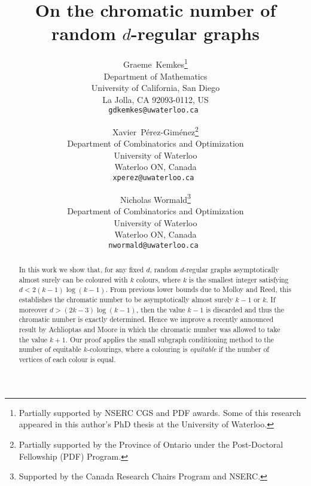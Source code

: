 \documentclass[12pt]{article}
\begin{document}
  \title{ On the chromatic number of random $d$-regular graphs}
\author{
Graeme~Kemkes\thanks{Partially supported by NSERC CGS and PDF awards. Some of this research appeared in this author's PhD thesis at the University of Waterloo.}\\
{\small Department of Mathematics}\\
{\small University of California, San Diego}\\
{\small La Jolla, CA 92093-0112, US}\\
{\small {\tt gdkemkes@uwaterloo.ca }}
\and
Xavier~P\'erez-Gim\'enez\thanks{Partially supported by the Province of Ontario under the Post-Doctoral Fellowship (PDF) Program.}\\
{\small Department of Combinatorics and Optimization} \\
{\small University of Waterloo}\\ 
{\small Waterloo ON, Canada}\\
{\small {\tt xperez@uwaterloo.ca }}
\and
Nicholas Wormald\thanks{Supported by the  Canada Research Chairs Program and NSERC.}\\
{\small Department of Combinatorics and Optimization} \\
{\small University of Waterloo}\\ 
{\small Waterloo ON, Canada}\\
{\small {\tt nwormald@uwaterloo.ca }} 
} 
\date{}
\maketitle
%
\begin{abstract}
In this work we show that, for any fixed $d$, random $d$-regular graphs asymptotically almost surely can be coloured with $k$ colours, where $k$ is the smallest integer satisfying $d < 2(k-1)\log(k-1)$. From previous lower bounds due to Molloy and Reed, this establishes the chromatic number to be asymptotically almost surely $k-1$ or $k$. If moreover $d>(2k-3)\log(k-1)$, then the value $k-1$ is discarded and thus the chromatic number is exactly determined. Hence we improve a recently announced result by Achlioptas and Moore in which the chromatic number was allowed to take the value $k+1$. Our proof applies the small subgraph conditioning method to the number of equitable $k$-colourings, where a colouring is  \emph{equitable} if the number of vertices of each colour is equal.
\end{abstract}
%
\end{document}
